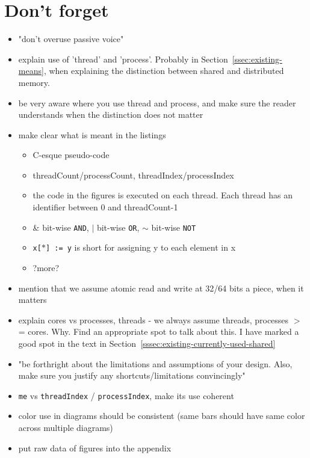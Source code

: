 \documentclass[a4paper, 10pt]{article}
\begin{document}
\section{Don't forget}
\begin{itemize}
	\item "don't overuse passive voice"
	\item explain use of 'thread' and 'process'. Probably in Section~\ref{ssec:existing-means}, when explaining the distinction between shared and distributed memory.
	\item be very aware where you use thread and process, and make sure the reader understands when the distinction does not matter
	\item make clear what is meant in the listings
		\begin{itemize}
			\item C-esque pseudo-code
			\item threadCount/processCount,  threadIndex/processIndex
			\item the code in the figures is executed on each thread. Each thread has an identifier between 0 and threadCount-1
			\item \& bit-wise \texttt{AND}, $|$ bit-wise \texttt{OR}, $\sim$ bit-wise \texttt{NOT}
			\item \texttt{x[$*$] := y} is short for assigning y to each element in x
			\item ?more?
		\end{itemize}
	\item mention that we assume atomic read and write at 32/64 bits a piece, when it matters
	\item explain cores vs processes, threads - we always assume threads, processes $>$= cores. Why. Find an appropriate spot to talk about this. I have marked a good spot in the text in Section~\ref{sssec:existing-currently-used-shared}
	\item "be forthright about the limitations and assumptions of your design. Also, make sure you justify any shortcuts/limitations convincingly"
	\item \texttt{me} vs \texttt{threadIndex} / \texttt{processIndex}, make its use coherent
	\item color use in diagrams should be consistent (same bars should have same color across multiple diagrams)
	\item put raw data of figures into the appendix
\end{itemize}

\end{document}
